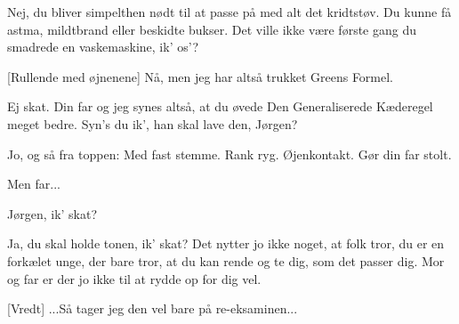 \documentclass[a4paper,11pt]{article}
\begin{document}
\begin{sketch}
 Nej, du bliver simpelthen nødt til at passe på med alt det kridtstøv. Du kunne få astma, mildtbrand eller beskidte bukser. Det ville ikke være første gang du smadrede en vaskemaskine, ik' os'?

[Rullende med øjnenene] Nå, men jeg har altså trukket Greens Formel.

 Ej skat. Din far og jeg synes altså, at du øvede Den Generaliserede Kæderegel meget bedre. Syn's du ik', han skal lave den, Jørgen?

 Jo, og så fra toppen: Med fast stemme. Rank ryg. Øjenkontakt. Gør din far stolt.

 Men far...

 Jørgen, ik' skat?

 Ja, du skal holde tonen, ik' skat? Det nytter jo ikke noget, at folk tror, du er en forkælet unge, der bare tror, at du kan rende og te dig, som det passer dig. Mor og far er der jo ikke til at rydde op for dig vel.

[Vredt] ...Så tager jeg den vel bare på re-eksaminen...



\end{sketch}
\end{document}
